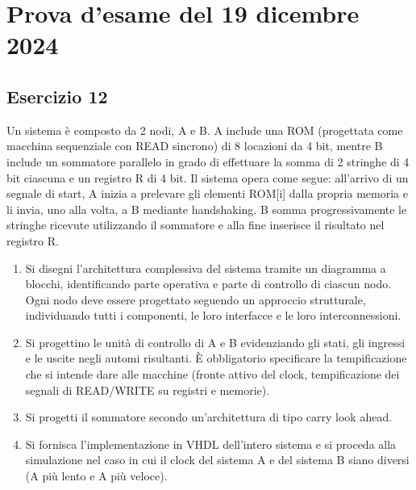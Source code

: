\chapter{Prova d'esame del 19 dicembre 2024}

\section{Esercizio 12}

\begin{traccia}
	Un sistema è composto da 2 nodi, A e B. A include una ROM (progettata come macchina
	sequenziale con READ sincrono) di 8 locazioni da 4 bit, mentre B include un sommatore
	parallelo in grado di effettuare la somma di 2 stringhe di 4 bit ciascuna e un registro R
	di 4 bit. Il sistema opera come segue: all'arrivo di un segnale di start, A inizia a
	prelevare gli elementi ROM[i] dalla propria memoria e li invia, uno alla volta, a B
	mediante handshaking. B somma progressivamente le stringhe ricevute utilizzando il
	sommatore e alla fine inserisce il risultato nel registro R.
	\begin{enumerate}[nosep]
		\item Si disegni l'architettura complessiva del sistema tramite un diagramma a blocchi,
		      identificando parte operativa e parte di controllo di ciascun nodo. Ogni nodo deve
		      essere progettato seguendo un approccio strutturale, individuando tutti i
		      componenti, le loro interfacce e le loro interconnessioni.
		\item Si progettino le unità di controllo di A e B evidenziando gli stati, gli ingressi
		      e le uscite negli automi risultanti. È obbligatorio specificare la tempificazione
		      che si intende dare alle macchine (fronte attivo del clock, tempificazione dei
		      segnali di READ/WRITE su registri e memorie).
		\item Si progetti il sommatore secondo un'architettura di tipo carry look ahead.
		\item Si fornisca l'implementazione in VHDL dell'intero sistema e si proceda alla
		      simulazione nel caso in cui il clock del sistema A e del sistema B siano diversi
		      (A più lento e A più veloce).
	\end{enumerate}
\end{traccia}

